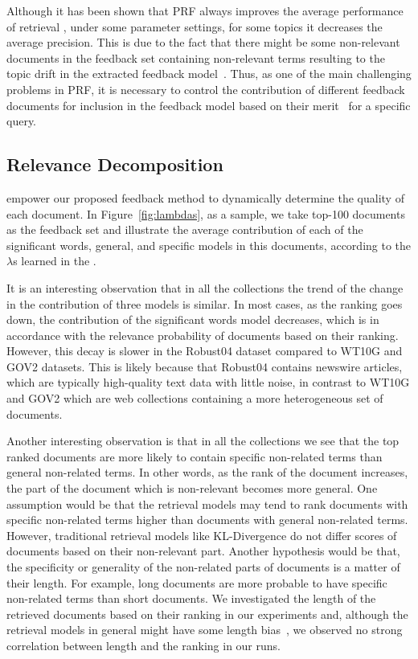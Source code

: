 Although it has been shown that PRF always improves the average performance of retrieval \citep{Harman:2009}, under some parameter settings, for some topics it decreases the average precision.  This is due to the fact that there might be some non-relevant documents in the feedback set containing non-relevant terms resulting to the topic drift in the extracted feedback model~\cite{He:2009:ECIR,He:2009:CIKM,Carpineto:2012}. Thus, as one of the main challenging problems in PRF, it is necessary to control the contribution of different feedback documents for inclusion in the feedback model based on their merit~\citep{He:2009:ECIR} for a specific query. 

\subsection{Relevance Decomposition}

\Swlms empower our proposed feedback method to dynamically determine the quality of each document.
In Figure~\ref{fig:lambdas}, as a sample, we take top-100 documents as the feedback set and illustrate the average contribution of each of the significant words, general, and specific models in this documents, according to the $\lambda$s learned in the \rswlms. 

It is an interesting observation that in all the collections the trend of the change in the contribution of three models is similar. 
In most cases, as the ranking goes down, the contribution of the significant words model decreases, which is in accordance with the relevance probability of documents based on their ranking.  However, this decay is slower in the Robust04 dataset compared to WT10G and GOV2 datasets.  This is likely because that Robust04 contains newswire articles, which are typically high-quality text data with little noise, in contrast to WT10G and GOV2 which are web collections containing a more heterogeneous set of documents.  

Another interesting observation is that in all the collections we see that the top ranked documents are more likely to contain specific non-related terms than general non-related terms. In other words, as the rank of the document increases, the part of the document which is non-relevant becomes more general. 
%
One assumption would be that the retrieval models may tend to rank documents with specific non-related terms higher than documents with general non-related terms.  However, traditional retrieval models like KL-Divergence do not differ scores of documents based on their non-relevant part. Another hypothesis would be that, the specificity or generality of the non-related parts of documents is a matter of their length. For example, long documents are more probable to have specific non-related terms than short documents. We investigated the length of the retrieved documents based on their ranking in our experiments and, although the retrieval models in general might have some length bias~\citep{Losada:2008}, we observed no strong correlation between length and the ranking in our runs.

